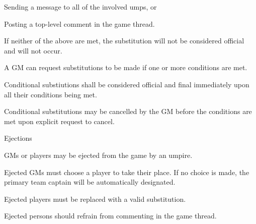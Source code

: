 \begin{deepEnumerate}
\begin{deepEnumerate}
\begin{deepEnumerate}
\begin{deepEnumerate}
				\item Sending a message to all of the involved umps, or 
				\item Posting a top-level comment in the game thread.
			\end{deepEnumerate}
			\item If neither of the above are met, the substitution will not be considered official and will not occur.
			\item A GM can request substitutions to be made if one or more conditions are met.
			\begin{deepEnumerate}
				\item Conditional substiutions shall be considered official and final immediately upon all their conditions being met. 
				\item Conditional substitutions may be cancelled by the GM before the conditions are met upon explicit request to cancel.
			\end{deepEnumerate}
		\end{deepEnumerate}
	\end{deepEnumerate}
	\item Ejections
	\begin{deepEnumerate}
		\item GMs or players may be ejected from the game by an umpire.
		\begin{deepEnumerate}
			\item Ejected GMs must choose a player to take their place. If no choice is made, the primary team captain will be automatically designated.
			\item Ejected players must be replaced with a valid substitution.
			\item Ejected persons should refrain from commenting in the game thread.
		\end{deepEnumerate}
	\end{deepEnumerate}
\end{deepEnumerate}
